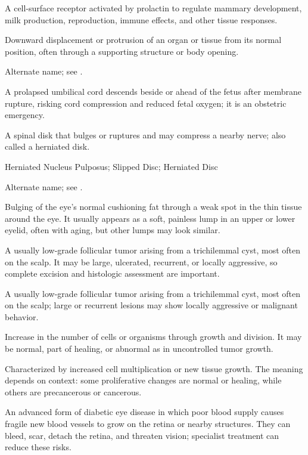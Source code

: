  A cell-surface receptor activated by prolactin to regulate mammary development, milk production, reproduction, immune effects, and other tissue responses.

 Downward displacement or protrusion of an organ or tissue from its normal position, often through a supporting structure or body opening.

 Alternate name; see .

 A prolapsed umbilical cord descends beside or ahead of the fetus after membrane rupture, risking cord compression and reduced fetal oxygen; it is an obstetric emergency.

 A spinal disk that bulges or ruptures and may compress a nearby nerve; also called a herniated disk.

\synonyms
Herniated Nucleus Pulposus; Slipped Disc; Herniated Disc

 Alternate name; see .

 Bulging of the eye’s normal cushioning fat through a weak spot in the thin tissue around the eye. It usually appears as a soft, painless lump in an upper or lower eyelid, often with aging, but other lumps may look similar.

 A usually low-grade follicular tumor arising from a trichilemmal cyst, most often on the scalp. It may be large, ulcerated, recurrent, or locally aggressive, so complete excision and histologic assessment are important.

 A usually low-grade follicular tumor arising from a trichilemmal cyst, most often on the scalp; large or recurrent lesions may show locally aggressive or malignant behavior.

 Increase in the number of cells or organisms through growth and division. It may be normal, part of healing, or abnormal as in uncontrolled tumor growth.

 Characterized by increased cell multiplication or new tissue growth. The meaning depends on context: some proliferative changes are normal or healing, while others are precancerous or cancerous.

 An advanced form of diabetic eye disease in which poor blood supply causes fragile new blood vessels to grow on the retina or nearby structures. They can bleed, scar, detach the retina, and threaten vision; specialist treatment can reduce these risks.

